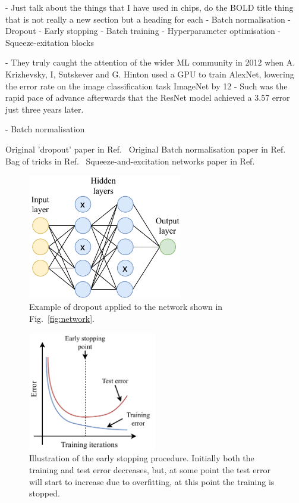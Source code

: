 - Just talk about the things that I have used in chips, do the BOLD title thing that is not really
a new section but a heading for each
- Batch normalisation
- Dropout
- Early stopping
- Batch training
- Hyperparameter optimisation
- Squeeze-exitation blocks

- They truly caught the attention of the wider ML community in 2012 when A. Krizhevsky, I,
Sutskever and G. Hinton used a GPU to train AlexNet, lowering the error rate on the image
classification task ImageNet by 12%
- Such was the rapid pace of advance afterwards that the ResNet model achieved a 3.57\percent
error just three years later.

- Batch normalisation

Original 'dropout' paper in Ref.~\cite{hinton2012}
Original Batch normalisation paper in Ref.~\cite{ioffe2015}
Bag of tricks in Ref.~\cite{he2019}
Squeeze-and-excitation networks paper in Ref.~\cite{hu2018}

\begin{figure} %
    \includegraphics[width=0.6\textwidth]{diagrams/7-cvn/dropout.pdf}
    \caption[dropout short]
    {Example of dropout applied to the network shown in Fig.~\ref{fig:network}.}
    \label{fig:dropout}
\end{figure}

\begin{figure} %
    \includegraphics[width=0.5\textwidth]{diagrams/7-cvn/early_stopping.pdf}
    \caption[Illustration of the early stopping procedure.]
    {Illustration of the early stopping procedure. Initially both the training and test error
        decreases, but, at some point the test error will start to increase due to overfitting, at
        this point the training is stopped.}
    \label{fig:early_stopping}
\end{figure}

